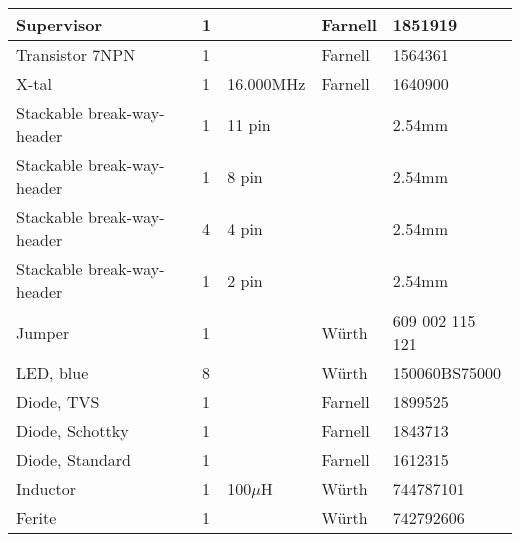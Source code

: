 \documentclass[10pt, titlepage]{article}
\begin{document}
\begin{center}
\begin{tabularx}{\textwidth}{|X|l|l|l|l|}
Supervisor & 1 & & Farnell & 1851919 \\ \hline
Transistor 7NPN	& 1 & &	Farnell	& 1564361 \\ \hline
X-tal & 1 & 16.000MHz & Farnell & 1640900 \\ \hline
Stackable break-way-header & 1 & 11 pin & & 2.54mm  \\ \hline
Stackable break-way-header & 1 & 8 pin & & 2.54mm \\ \hline
Stackable break-way-header & 4 & 4 pin & & 2.54mm \\ \hline
Stackable break-way-header & 1 & 2 pin & & 2.54mm \\ \hline
Jumper & 1 & & Würth & 609 002 115 121 \\ \hline
LED, blue & 8 & & Würth & 150060BS75000 \\ \hline
Diode, TVS & 1 & & Farnell & 1899525 \\ \hline
Diode, Schottky & 1 & & Farnell & 1843713 \\ \hline
Diode, Standard & 1 & & Farnell & 1612315 \\ \hline
Inductor & 1 & 100$\mu$H & Würth & 744787101 \\ \hline
Ferite & 1 & & Würth & 742792606 \\ \hline

\end{tabularx}
\end{center}

\newpage
\end{document}
